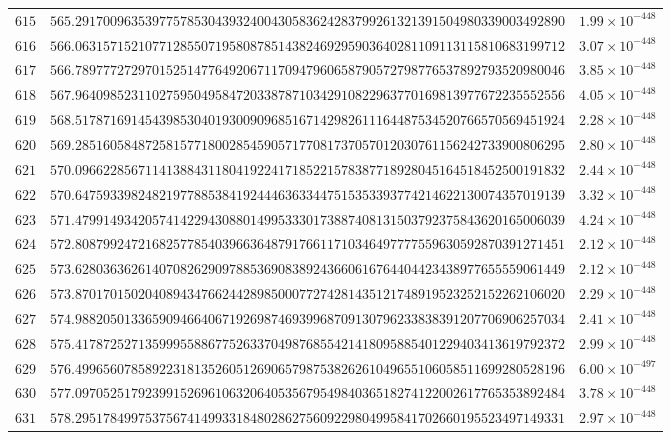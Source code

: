 \documentclass[12pt,reqno]{amsart}
\theoremstyle{remark}
\begin{document}
\begin{longtable}{clc}
$615$ & $565.2917009635397757853043932400430583624283799261321391504980339003492890$ & $1.99\times 10^{-448}$ \\
$616$ & $566.0631571521077128550719580878514382469295903640281109113115810683199712$ & $3.07\times 10^{-448}$ \\
$617$ & $566.7897772729701525147764920671170947960658790572798776537892793520980046$ & $3.85\times 10^{-448}$ \\
$618$ & $567.9640985231102759504958472033878710342910822963770169813977672235552556$ & $4.05\times 10^{-448}$ \\
$619$ & $568.5178716914543985304019300909685167142982611164487534520766570569451924$ & $2.28\times 10^{-448}$ \\
$620$ & $569.2851605848725815771800285459057177081737057012030761156242733900806295$ & $2.80\times 10^{-448}$ \\
$621$ & $570.0966228567114138843118041922417185221578387718928045164518452500191832$ & $2.44\times 10^{-448}$ \\
$622$ & $570.6475933982482197788538419244463633447515353393774214622130074357019139$ & $3.32\times 10^{-448}$ \\
$623$ & $571.4799149342057414229430880149953330173887408131503792375843620165006039$ & $4.24\times 10^{-448}$ \\
$624$ & $572.8087992472168257785403966364879176611710346497777559630592870391271451$ & $2.12\times 10^{-448}$ \\
$625$ & $573.6280363626140708262909788536908389243660616764404423438977655559061449$ & $2.12\times 10^{-448}$ \\
$626$ & $573.8701701502040894347662442898500077274281435121748919523252152262106020$ & $2.29\times 10^{-448}$ \\
$627$ & $574.9882050133659094664067192698746939968709130796233838391207706906257034$ & $2.41\times 10^{-448}$ \\
$628$ & $575.4178725271359995588677526337049876855421418095885401229403413619792372$ & $2.99\times 10^{-448}$ \\
$629$ & $576.4996560785892231813526051269065798753826261049655106058511699280528196$ & $6.00\times 10^{-497}$ \\
$630$ & $577.0970525179239915269610632064053567954984036518274122002617765353892484$ & $3.78\times 10^{-448}$ \\
$631$ & $578.2951784997537567414993318480286275609229804995841702660195523497149331$ & $2.97\times 10^{-448}$ \\

\end{longtable}
\end{document}
